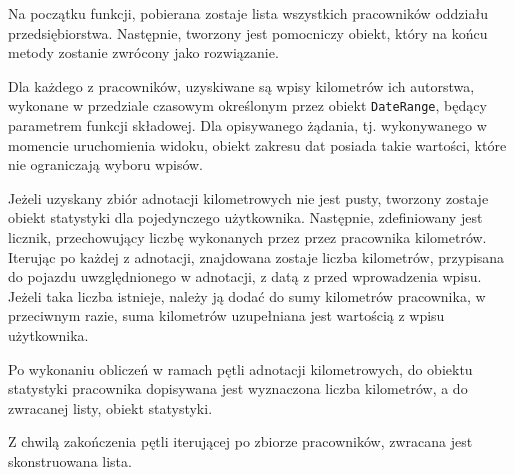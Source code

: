 Na początku funkcji, pobierana zostaje lista wszystkich pracowników oddziału przedsiębiorstwa. Następnie, tworzony jest pomocniczy obiekt, który na końcu metody zostanie zwrócony jako rozwiązanie.

Dla każdego z pracowników, uzyskiwane są wpisy kilometrów ich autorstwa, wykonane w przedziale czasowym określonym przez obiekt \texttt{DateRange}, będący parametrem funkcji składowej. Dla opisywanego żądania, tj. wykonywanego w momencie uruchomienia widoku, obiekt zakresu dat posiada takie wartości, które nie ograniczają wyboru wpisów.

Jeżeli uzyskany zbiór adnotacji kilometrowych nie jest pusty, tworzony zostaje obiekt statystyki dla pojedynczego użytkownika. Następnie, zdefiniowany jest licznik, przechowujący liczbę wykonanych przez przez pracownika kilometrów. Iterując po każdej z adnotacji, znajdowana zostaje liczba kilometrów, przypisana do pojazdu uwzględnionego w adnotacji, z datą z przed wprowadzenia wpisu. Jeżeli taka liczba istnieje, należy ją dodać do sumy kilometrów pracownika, w przeciwnym razie, suma kilometrów uzupełniana jest wartością z wpisu użytkownika.

Po wykonaniu obliczeń w ramach pętli adnotacji kilometrowych, do obiektu statystyki pracownika dopisywana jest wyznaczona liczba kilometrów, a do zwracanej listy, obiekt statystyki.

Z chwilą zakończenia pętli iterującej po zbiorze pracowników, zwracana jest skonstruowana lista.


